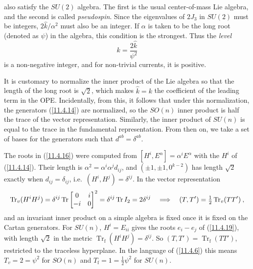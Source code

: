 also satisfy the $SU(2)$ algebra. The first is the usual center-of-mass Lie algebra, and the second is called \emph{pseudospin}. Since the eigenvalues of $2J_{3}$ in $SU(2)$ must be integers, $2\hat{k}/\alpha^{2}$ must also be an integer. If $\alpha$ is taken to be the long root (denoted as $\psi$) in the algebra, this condition is the strongest. Thus the \emph{level}
\begin{equation}
	k=\frac{2\hat{k}}{\psi^{2}} \label{11.5.13}
\end{equation}
is a non-negative integer, and for non-trivial currents, it is positive.

It is customary to normalize the inner product of the Lie algebra so that the length of the long root is $\sqrt{2}$, which makes $\hat{k}=k$ the coefficient of the leading term in the OPE. Incidentally, from this, it follows that under this normalization, the generators (\ref{11.4.14}) are normalized, so the $SO(n)$ inner product is half the trace of the vector representation. Similarly, the inner product of $SU(n)$ is equal to the trace in the fundamental representation. From then on, we take a set of bases for the generators such that $d^{ab}=\delta^{ab}$.
\begin{tcolorbox}[breakable]
	\begin{remark}
		The roots in (\ref{11.4.16}) were computed from $[H^{i},E^{\alpha}]=\alpha^{i}E^{\alpha}$ with the $H^{i}$ of (\ref{11.4.14}). Their length is $\alpha^{2}=\alpha^{i}\alpha^{j}d_{ij}$, and $(\pm1,\pm1,0^{k-2})$ has length $\sqrt{2}$ exactly when $d_{ij}=\delta_{ij}$, i.e.\ $(H^{i},H^{j})=\delta^{ij}$. In the vector representation
		\begin{equation*}
			\operatorname{Tr}_{v}(H^{i}H^{j})=\delta^{ij}\operatorname{Tr}\begin{bmatrix}0&i\\-i&0\end{bmatrix}^{2}=\delta^{ij}\operatorname{Tr}I_{2}=2\delta^{ij}
			\quad\Longrightarrow\quad (T,T')=\tfrac{1}{2}\operatorname{Tr}_{v}(TT')\:,
		\end{equation*}
		and an invariant inner product on a simple algebra is fixed once it is fixed on the Cartan generators. For $SU(n)$, $H^{i}=E_{ii}$ gives the roots $e_{i}-e_{j}$ of (\ref{11.4.19}), with length $\sqrt{2}$ in the metric $\operatorname{Tr}_{\text{f}}(H^{i}H^{j})=\delta^{ij}$. So $(T,T')=\operatorname{Tr}_{\text{f}}(TT')$, restricted to the traceless hyperplane. In the language of (\ref{11.4.6}) this means $T_{v}=2=\psi^{2}$ for $SO(n)$ and $T_{\text{f}}=1=\frac{1}{2}\psi^{2}$ for $SU(n)$.
	\end{remark}
\end{tcolorbox}


